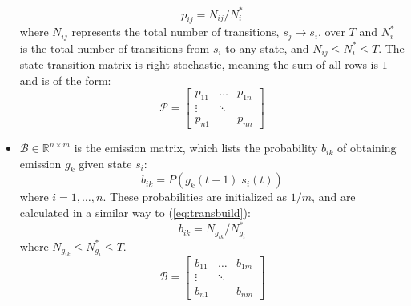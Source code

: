 \documentclass[letterpaper, 10 pt, conference]{ieeeconf}  %
\newcommand\NB[1]{$\spadesuit$\footnote{NB: #1}}
\begin{document}
\begin{itemize}
        \begin{equation} \label{eq:transbuild}
            p_{ij} = N_{ij}/N^*_{i}
        \end{equation}
        where $N_{ij}$ represents the total number of transitions, $s_j \to s_i$, over $T$ and $N^*_{i}$ is the total number of transitions from $s_i$ to any state, and $N_{ij} \leq N^*_{i} \leq T$. The state transition matrix is right-stochastic, meaning the sum of all rows is $1$ and is of the form:
        \begin{equation}
            \mathcal{P} = 
                    \begin{bmatrix}
                        p_{11} & \dots & p_{1n} \\
                        \vdots & \ddots & \\
                        p_{n1} &    & p_{nn}
                    \end{bmatrix}
        \end{equation}
    \item $\mathcal{B}\in\mathbb{R}^{n\times m}$ is the emission matrix, which lists the probability $b_{ik}$ of obtaining emission $g_k$ given state $s_i$:
        \begin{equation} \label{eq:obsref}
            b_{ik} = P(g_k(t+1) \vert s_i(t))
        \end{equation}
        where $i = 1,\ldots,n$. These probabilities are initialized as $1/m$, and are calculated in a similar way to (\ref{eq:transbuild}):
        \begin{equation} \label{eq:obsbuild}
            b_{ik} = N_{g_{ik}}/N^*_{g_{i}}
        \end{equation} 
        where $N_{g_{ik}} \leq N^*_{g_{i}} \leq T$.
        \begin{equation}
            \mathcal{B} = 
                    \begin{bmatrix}
                        b_{11} & \dots & b_{1m} \\
                        \vdots & \ddots & \\
                        b_{n1} &    & b_{nm}
                    \end{bmatrix}
        \end{equation}
\end{itemize}
\end{document}

